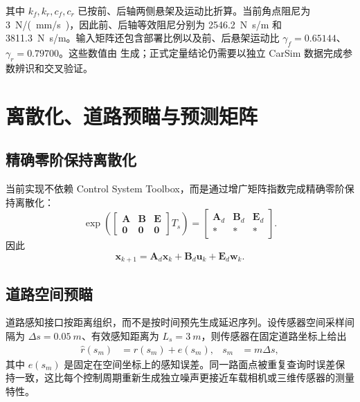 \documentclass[UTF8,12pt,a4paper,fontset=windows]{ctexart}
\newcommand{\vect}[1]{\bm{#1}}
\begin{document}
其中 $k_f,k_r,c_f,c_r$ 已按前、后轴两侧悬架及运动比折算。当前角点阻尼为 \SI{3}{N/(mm/s)}，因此前、后轴等效阻尼分别为 \SI{2546.2}{N.s/m} 和 \SI{3811.3}{N.s/m}。输入矩阵还包含部署比例以及前、后悬架运动比 $\gamma_f=0.65144$、$\gamma_r=0.79700$。这些数值由  生成；正式定量结论仍需要以独立 CarSim 数据完成参数辨识和交叉验证。

\section{离散化、道路预瞄与预测矩阵}

\subsection{精确零阶保持离散化}

当前实现不依赖 Control System Toolbox，而是通过增广矩阵指数完成精确零阶保持离散化：
\begin{equation}
\exp\!\left(
\begin{bmatrix}
\vect{A} & \vect{B} & \vect{E}\\
\vect{0} & \vect{0} & \vect{0}
\end{bmatrix}T_s\right)
=
\begin{bmatrix}
\vect{A}_d & \vect{B}_d & \vect{E}_d\\
\ast & \ast & \ast
\end{bmatrix}.
\end{equation}
因此
\begin{equation}
\vect{x}_{k+1}=\vect{A}_d\vect{x}_k+\vect{B}_d\vect{u}_k+\vect{E}_d\vect{w}_k.
\end{equation}

\subsection{道路空间预瞄}

道路感知接口按距离组织，而不是按时间预先生成延迟序列。设传感器空间采样间隔为 $\Delta s=\SI{0.05}{m}$、有效感知距离为 $L_s=\SI{3}{m}$，则传感器在固定道路坐标上给出
\begin{align}
\hat r(s_m)&=r(s_m)+e(s_m), & s_m&=m\Delta s,
\end{align}
其中 $e(s_m)$ 是固定在空间坐标上的感知误差。同一路面点被重复查询时误差保持一致，这比每个控制周期重新生成独立噪声更接近车载相机或三维传感器的测量特性。
\end{document}
